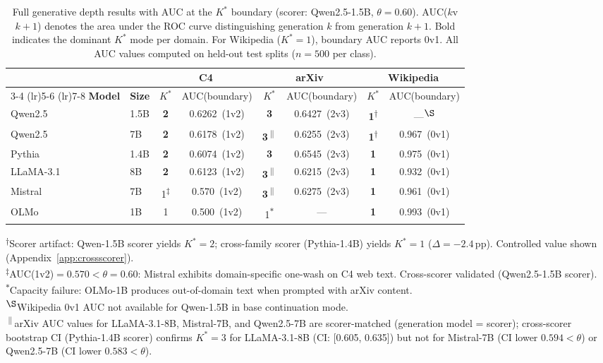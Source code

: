 \begin{table}[t]
\centering
\caption{Full generative depth results with AUC at the $K^*$ boundary (scorer: Qwen2.5-1.5B, $\theta{=}0.60$). AUC($k$v$k{+}1$) denotes the area under the ROC curve distinguishing generation $k$ from generation $k{+}1$. Bold indicates the dominant $K^*$ mode per domain. For Wikipedia ($K^*{=}1$), boundary AUC reports 0v1. All AUC values computed on held-out test splits ($n{=}500$ per class).}
\label{tab:domain_model_kstar_full}
{\small
\begin{tabular}{llcccccc}
\toprule
& & \multicolumn{2}{c}{\textbf{C4}} & \multicolumn{2}{c}{\textbf{arXiv}} & \multicolumn{2}{c}{\textbf{Wikipedia}} \\
\cmidrule(lr){3-4} \cmidrule(lr){5-6} \cmidrule(lr){7-8}
\textbf{Model} & \textbf{Size} & $K^*$ & AUC(boundary) & $K^*$ & AUC(boundary) & $K^*$ & AUC(boundary) \\
\midrule
Qwen2.5       & 1.5B & \textbf{2} & 0.6262~(1v2) & \textbf{3} & 0.6427~(2v3) & \textbf{1}\textsuperscript{$\dagger$} & ---\textsuperscript{$\S$} \\
Qwen2.5       & 7B   & \textbf{2} & 0.6178~(1v2) & \textbf{3}\textsuperscript{$\|$} & 0.6255~(2v3) & \textbf{1}\textsuperscript{$\dagger$} & 0.967~(0v1) \\
Pythia        & 1.4B & \textbf{2} & 0.6074~(1v2) & \textbf{3} & 0.6545~(2v3) & \textbf{1} & 0.975~(0v1) \\
LLaMA-3.1    & 8B   & \textbf{2} & 0.6123~(1v2) & \textbf{3}\textsuperscript{$\|$} & 0.6215~(2v3) & \textbf{1} & 0.932~(0v1) \\
Mistral       & 7B   & 1\textsuperscript{$\ddagger$} & 0.570~(1v2) & \textbf{3}\textsuperscript{$\|$} & 0.6275~(2v3) & \textbf{1} & 0.961~(0v1) \\
OLMo          & 1B   & 1 & 0.500~(1v2) & 1\textsuperscript{$*$} & --- & \textbf{1} & 0.993~(0v1) \\
\bottomrule
\end{tabular}
}
\vspace{2pt}

{\footnotesize
\textsuperscript{$\dagger$}Scorer artifact: Qwen-1.5B scorer yields $K^*{=}2$; cross-family scorer (Pythia-1.4B) yields $K^*{=}1$ ($\Delta = -2.4$\,pp). Controlled value shown (Appendix~\ref{app:crossscorer}).\\
\textsuperscript{$\ddagger$}AUC(1v2)${=}0.570{<}\theta{=}0.60$: Mistral exhibits domain-specific one-wash on C4 web text. Cross-scorer validated (Qwen2.5-1.5B scorer).\\
\textsuperscript{$*$}Capacity failure: OLMo-1B produces out-of-domain text when prompted with arXiv content.\\
\textsuperscript{$\S$}Wikipedia 0v1 AUC not available for Qwen-1.5B in base continuation mode.\\
\textsuperscript{$\|$}arXiv AUC values for LLaMA-3.1-8B, Mistral-7B, and Qwen2.5-7B are scorer-matched (generation model = scorer); cross-scorer bootstrap CI (Pythia-1.4B scorer) confirms $K^*{=}3$ for LLaMA-3.1-8B (CI: [0.605, 0.635]) but not for Mistral-7B (CI lower $0.594{<}\theta$) or Qwen2.5-7B (CI lower $0.583{<}\theta$).
}
\end{table}
